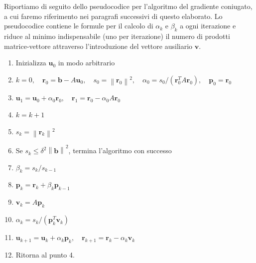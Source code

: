 \documentclass[a4paper,11pt]{article}
\renewcommand{\vec}[1]{\bm{#1}}
\newcommand{\norm}[1]{\left\lVert#1\right\rVert}
\begin{document}
Riportiamo di seguito dello pseudocodice per l'algoritmo
del gradiente coniugato, a cui faremo riferimento nei
paragrafi successivi di questo elaborato.
Lo pseudocodice contiene le formule per il calcolo di
$\alpha_k$ e $\beta	_k$ a ogni iterazione e riduce al minimo
indispensabile (uno per iterazione) il numero di prodotti
matrice-vettore attraverso l'introduzione del vettore
ausiliario $\vec{v}$.
\begin{enumerate}
\item Inizializza $\vec{u}_0$ in modo arbitrario
\item $k = 0,
\quad \vec{r}_0 = \vec{b} - A \vec{u}_0,
\quad s_0 = \norm{\vec{r}_0}^2,
\quad \alpha_0 = s_0/(\vec{r}_0^T A \vec{r}_0),
\quad \vec{p}_0 = \vec{r}_0$
\item $\vec{u}_1 = \vec{u}_0 + \alpha_0 \vec{r}_0,
\quad \vec{r}_1 = \vec{r}_0 - \alpha_0 A \vec{r}_0$
\item $k = k + 1$
\item $s_k = \norm{\vec{r}_k}^2$
\item Se $s_k \leq \delta^2 \norm{\vec{b}}^2$,
termina l'algoritmo con successo
\item $\beta_k = s_k / s_{k-1}$
\item $\vec{p}_k = \vec{r}_k + \beta_k \vec{p}_{k-1}$
\item $\vec{v}_k = A \vec{p}_k$
\item $\alpha_k = s_k / (\vec{p}_k^T \vec{v}_k)$
\item $\vec{u}_{k+1} = \vec{u}_k + \alpha_k \vec{p}_k,
\quad \vec{r}_{k+1} = \vec{r}_k - \alpha_k \vec{v}_k$
\item Ritorna al punto 4.
\end{enumerate}
\end{document}
